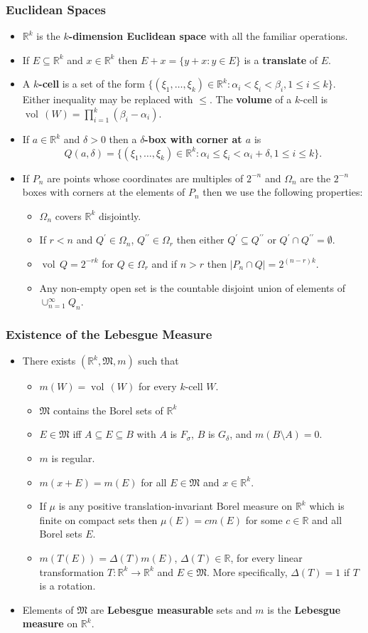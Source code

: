 \documentclass{article}
\newcounter{topicnumber}[section]
\newcommand{\steptopic}[1][1]{\addtocounter{topicnumber}{#1}}
\newenvironment{topic}[1]{%
\steptopic%
\subsubsection{#1}%
\begin{itemize}%
}{%
\end{itemize}%
}
\newcommand{\term}[1]{{\bf #1}}
\newcommand{\remark}{\item}
\DeclareMathOperator{\vol}{vol\,}
\begin{document}
\begin{topic}{Euclidean Spaces}
\remark $\mathbb{R}^k$ is the \term{$k$-dimension Euclidean space} with all the familiar operations.
\remark If $E \subseteq \mathbb{R}^k$ and $x \in \mathbb{R}^k$ then $E + x = \{ y + x : y \in E \}$ is a \term{translate} of $E$.
\remark A \term{$k$-cell} is a set of the form $\{ (\xi_1, \ldots, \xi_k) \in \mathbb{R}^k : \alpha_i < \xi_i < \beta_i, 1 \leq i \leq k \}$. Either inequality may be replaced with $\leq$. The \term{volume} of a $k$-cell is $\vol(W) = \prod_{i=1}^k (\beta_i - \alpha_i)$.
\remark If $a \in \mathbb{R}^k$ and $\delta > 0$ then a \term{$\delta$-box with corner at $a$} is $$Q(a, \delta) = \{ (\xi_1, \ldots, \xi_k) \in \mathbb{R}^k : \alpha_i \leq \xi_i < \alpha_i + \delta, 1 \leq i \leq k \}.$$
\remark If $P_n$ are points whose coordinates are multiples of $2^{-n}$ and $\Omega_n$ are the $2^{-n}$ boxes with corners at the elements of $P_n$ then we use the following properties:
\begin{itemize}
\item $\Omega_n$ covers $\mathbb{R}^k$ disjointly.
\item If $r < n$ and $Q^\prime \in \Omega_n$, $Q^{\prime\prime} \in \Omega_r$ then either $Q^\prime \subseteq Q^{\prime\prime}$ or $Q^\prime \cap Q^{\prime\prime} = \emptyset$.
\item $\vol{Q} = 2^{-rk}$ for $Q \in \Omega_r$ and if $n > r$ then $|P_n \cap Q| = 2^{(n-r)k}$.
\item Any non-empty open set is the countable disjoint union of elements of $\cup_{n=1}^\infty Q_n$.
\end{itemize}
\end{topic}

\begin{topic}{Existence of the Lebesgue Measure}
\remark There exists $(\mathbb{R}^k, \mathfrak{M}, m)$ such that
\begin{itemize}
\item $m(W) = \vol(W)$ for every $k$-cell $W$.
\item $\mathfrak{M}$ contains the Borel sets of $\mathbb{R}^k$
\item $E \in \mathfrak{M}$ iff $A \subseteq E \subseteq B$ with $A$ is $F_\sigma$, $B$ is $G_\delta$, and $m(B \setminus A) = 0$.
\item $m$ is regular.
\item $m(x + E) = m(E)$ for all $E \in \mathfrak{M}$ and $x \in \mathbb{R}^k$.
\item If $\mu$ is any positive translation-invariant Borel measure on $\mathbb{R}^k$ which is finite on compact sets then $\mu(E) = cm(E)$ for some $c \in \mathbb{R}$ and all Borel sets $E$.
\item $m(T(E)) = \Delta(T)m(E)$, $\Delta(T) \in \mathbb{R}$, for every linear transformation $T : \mathbb{R}^k \to \mathbb{R}^k$ and $E \in \mathfrak{M}$. More specifically, $\Delta(T) = 1$ if $T$ is a rotation.
\end{itemize}
\remark Elements of $\mathfrak{M}$ are \term{Lebesgue measurable} sets and $m$ is the \term{Lebesgue measure} on $\mathbb{R}^k$.
\end{topic}
\end{document}
